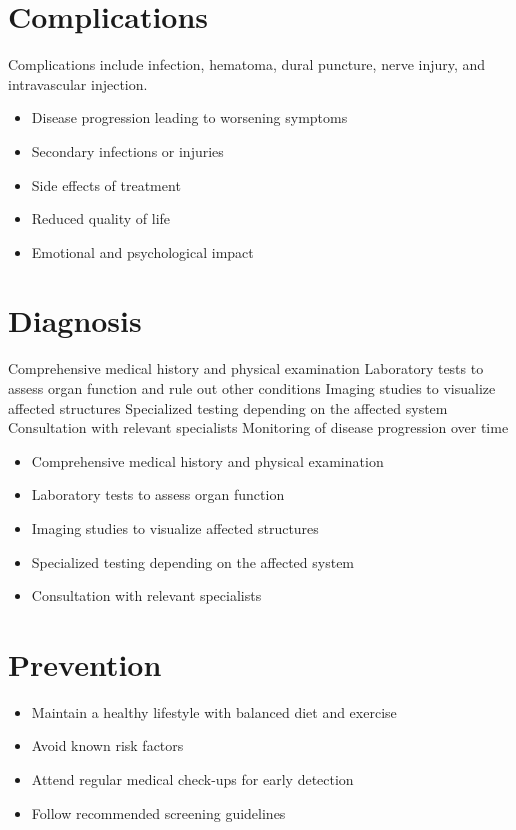 \section{Complications}
Complications include infection, hematoma, dural puncture, nerve injury, and intravascular injection.

\begin{itemize}[noitemsep]
  \item Disease progression leading to worsening symptoms
  \item Secondary infections or injuries
  \item Side effects of treatment
  \item Reduced quality of life
  \item Emotional and psychological impact
\end{itemize}
\section{Diagnosis}
Comprehensive medical history and physical examination Laboratory tests to assess organ function and rule out other conditions Imaging studies to visualize affected structures Specialized testing depending on the affected system Consultation with relevant specialists Monitoring of disease progression over time

\begin{itemize}[noitemsep]
  \item Comprehensive medical history and physical examination
  \item Laboratory tests to assess organ function
  \item Imaging studies to visualize affected structures
  \item Specialized testing depending on the affected system
  \item Consultation with relevant specialists
\end{itemize}
\section{Prevention}
\begin{itemize}[noitemsep]
  \item Maintain a healthy lifestyle with balanced diet and exercise
  \item Avoid known risk factors
  \item Attend regular medical check-ups for early detection
  \item Follow recommended screening guidelines
\end{itemize}
